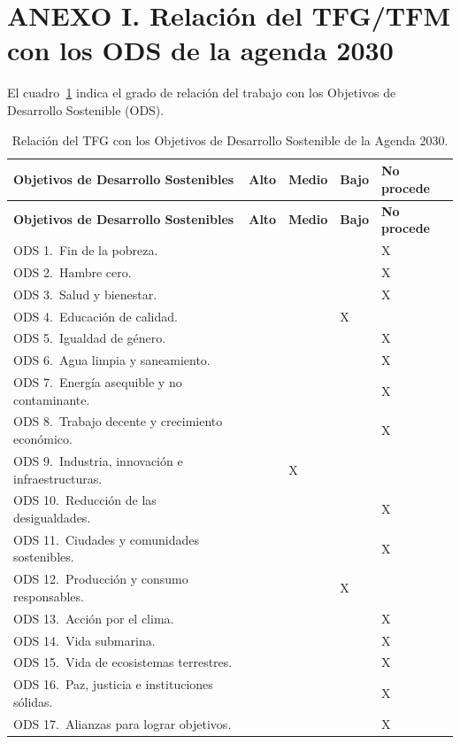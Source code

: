 
\chapter*{ANEXO I. Relación del TFG/TFM con los ODS de la agenda 2030}

El cuadro~\ref{tab:ods} indica el grado de relación del trabajo con los Objetivos de Desarrollo Sostenible (ODS).

\renewcommand{\arraystretch}{1.35}
\renewcommand{\thetable}{A.\arabic{table}}
\setcounter{table}{0}
\begin{longtable}{|p{6.7cm}|>{\centering\arraybackslash}p{1.5cm}|>{\centering\arraybackslash}p{1.5cm}|>{\centering\arraybackslash}p{1.5cm}|>{\centering\arraybackslash}p{1.8cm}|}
\caption{Relación del TFG con los Objetivos de Desarrollo Sostenible de la Agenda 2030.}\label{tab:ods}\\
\hline
\textbf{Objetivos de Desarrollo Sostenibles} & \textbf{Alto} & \textbf{Medio} & \textbf{Bajo} & \textbf{No procede} \\
\hline
\endfirsthead
\hline
\textbf{Objetivos de Desarrollo Sostenibles} & \textbf{Alto} & \textbf{Medio} & \textbf{Bajo} & \textbf{No procede} \\
\hline
\endhead
ODS 1.\ Fin de la pobreza. & & & & X \\
\hline
ODS 2.\ Hambre cero. & & & & X \\
\hline
ODS 3.\ Salud y bienestar. & & & & X \\
\hline
ODS 4.\ Educación de calidad. & & & X & \\
\hline
ODS 5.\ Igualdad de género. & & & & X \\
\hline
ODS 6.\ Agua limpia y saneamiento. & & & & X \\
\hline
ODS 7.\ Energía asequible y no contaminante. & & & & X \\
\hline
ODS 8.\ Trabajo decente y crecimiento económico. & & & & X \\
\hline
ODS 9.\ Industria, innovación e infraestructuras. & & X & & \\
\hline
ODS 10.\ Reducción de las desigualdades. & & & & X \\
\hline
ODS 11.\ Ciudades y comunidades sostenibles. & & & & X \\
\hline
ODS 12.\ Producción y consumo responsables. & & & X & \\
\hline
ODS 13.\ Acción por el clima. & & & & X \\
\hline
ODS 14.\ Vida submarina. & & & & X \\
\hline
ODS 15.\ Vida de ecosistemas terrestres. & & & & X \\
\hline
ODS 16.\ Paz, justicia e instituciones sólidas. & & & & X \\
\hline
ODS 17.\ Alianzas para lograr objetivos. & & & & X \\
\hline
\end{longtable}

